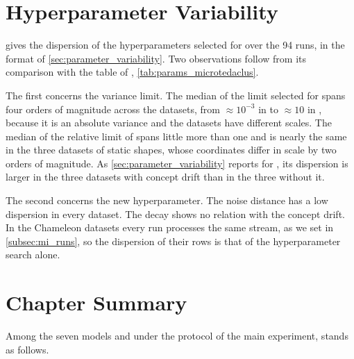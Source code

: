 \section{Hyperparameter Variability}
\label{sec:results_parameters}



 gives the dispersion of the hyperparameters selected for \MicroTEDAClusPlus over the 94 runs, in the format of \cref{sec:parameter_variability}. Two observations follow from its comparison with the table of \MicroTEDAClus, \cref{tab:params_microtedaclus}.

The first concerns the variance limit. The median of the limit selected for \MicroTEDAClus spans four orders of magnitude across the datasets, from $\approx 10^{-3}$ in \RandomRBFGeneratorEvents to $\approx 10$ in \ChameleonDSFour, because it is an absolute variance and the datasets have different scales. The median of the relative limit of \MicroTEDAClusPlus spans little more than one and is nearly the same in the three datasets of static shapes, whose coordinates differ in scale by two orders of magnitude. As \cref{sec:parameter_variability} reports for \MicroTEDAClus, its dispersion is larger in the three datasets with concept drift than in the three without it.

The second concerns the new hyperparameter. The noise distance has a low dispersion in every dataset. The decay shows no relation with the concept drift. In the Chameleon datasets every run processes the same stream, as we set in \cref{subsec:mi_runs}, so the dispersion of their rows is that of the hyperparameter search alone.

\section{Chapter Summary}
\label{sec:results_summary}

Among the seven models and under the protocol of the main experiment, \MicroTEDAClusPlus stands as follows.

